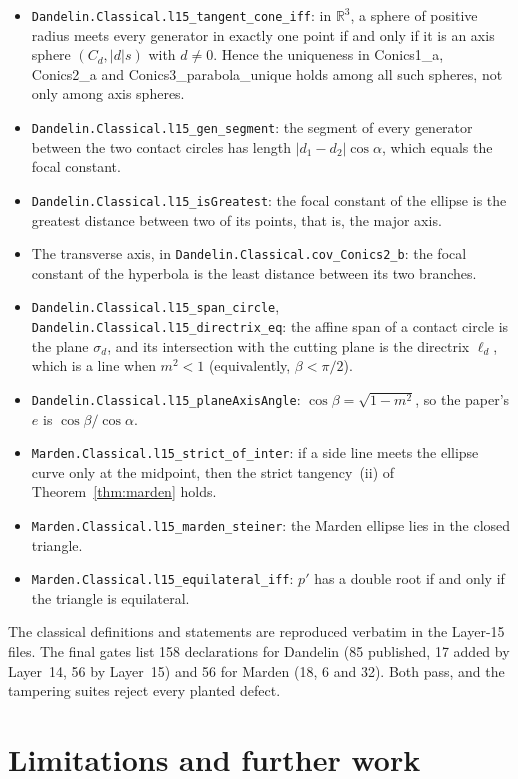 \documentclass[11pt]{article}
\theoremstyle{remark}
\newcommand{\lean}[1]{\texttt{#1}}
\newcommand{\R}{\mathbb{R}}
\begin{document}
\begin{itemize}
\item \lean{Dandelin.Classical.l15\_tangent\_cone\_iff}: in $\R^3$, a sphere of positive radius
meets every generator in exactly one point if and only if it is an axis sphere $(C_d,|d|s)$ with
$d\ne0$. Hence the uniqueness in Conics1\_a, Conics2\_a and Conics3\_parabola\_unique holds among
all such spheres, not only among axis spheres.
\item \lean{Dandelin.Classical.l15\_gen\_segment}: the segment of every generator between the two
contact circles has length $|d_1-d_2|\cos\alpha$, which equals the focal constant.
\item \lean{Dandelin.Classical.l15\_isGreatest}: the focal constant of the ellipse is the greatest
distance between two of its points, that is, the major axis.
\item The transverse axis, in \lean{Dandelin.Classical.cov\_Conics2\_b}: the focal constant of the
hyperbola is the least distance between its two branches.
\item \lean{Dandelin.Classical.l15\_span\_circle}, \lean{Dandelin.Classical.l15\_directrix\_eq}:
the affine span of a contact circle is the plane $\sigma_d$, and its intersection with the cutting
plane is the directrix $\ell_d$, which is a line when $m^2<1$ (equivalently, $\beta<\pi/2$).
\item \lean{Dandelin.Classical.l15\_planeAxisAngle}: $\cos\beta=\sqrt{1-m^2}$, so the paper's $e$ is
$\cos\beta/\cos\alpha$.
\item \lean{Marden.Classical.l15\_strict\_of\_inter}: if a side line meets the ellipse curve only at
the midpoint, then the strict tangency~(ii) of Theorem~\ref{thm:marden} holds.
\item \lean{Marden.Classical.l15\_marden\_steiner}: the Marden ellipse lies in the closed
triangle.
\item \lean{Marden.Classical.l15\_equilateral\_iff}: $p'$ has a double root if and only if the
triangle is equilateral.
\end{itemize}
The classical definitions and statements are reproduced verbatim in the Layer-15 files. The final
gates list 158 declarations for Dandelin (85 published, 17 added by Layer~14, 56 by Layer~15) and
56 for Marden (18, 6 and 32). Both pass, and the tampering suites reject every planted defect.
\par\endgroup

\section{Limitations and further work}
\end{document}
